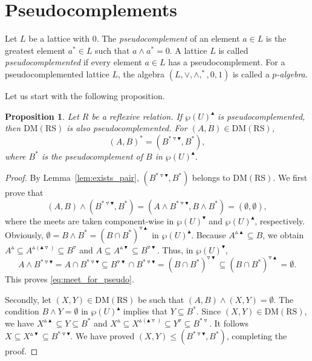 \documentclass[11pt,a4paper]{amsart}
\newcommand{\UP}{\blacktriangle}
\newcommand{\DOWN}{\blacktriangledown}
\newcommand{\Up}{\vartriangle}
\newcommand{\Down}{\triangledown}
\theoremstyle{plain}
\newtheorem{proposition}[theorem]{Proposition}
\theoremstyle{definition}
\theoremstyle{remark}
\numberwithin{equation}{section}
\begin{document}
\section{Pseudocomplements} \label{sec:pseudocomplements}

Let $L$ be a lattice with $0$. The \emph{pseudocomplement} of an element $a \in L$ is the greatest 
element $a^* \in L$ such that $a \wedge a^* = 0$. A lattice $L$ is called \emph{pseudocomplemented} 
if every element $a \in L$ has a pseudocomplement. For a pseudocomplemented lattice $L$,
the algebra $(L,\vee,\wedge,^*,0,1)$ is called a \emph{$p$-algebra}.

Let us start with the following proposition.

\begin{proposition} \label{prop:pseudomplement}
Let $R$ be a reflexive relation.
If $\wp(U)^\UP$ is pseudocomplemented, then $\mathrm{DM(RS)}$
is also pseudocomplemented. For $(A,B) \in \mathrm{DM(RS)}$, 
\[ (A,B)^* = (B^{* \Down \DOWN}, B^*),\]
where $B^*$ is the pseudocomplement of $B$ in $\wp(U)^\UP$.
\end{proposition}

\begin{proof} By Lemma~\ref{lem:exists_pair}, $(B^{* \Down \DOWN}, B^*)$
belongs to $\mathrm{DM(RS)}$. 
We first prove that 
\begin{equation} \label{eq:meet_for_pseudo}
 (A,B) \wedge (B^{* \Down \DOWN}, B^*) = 
  (A \wedge B^{* \Down \DOWN}, B \wedge B^*)
  = (\emptyset,\emptyset),
\end{equation}
where the meets are taken component-wise in 
$\wp(U)^\DOWN$ and $\wp(U)^\UP$, respectively.
Obviously, $\emptyset = B \wedge B^* = 
(B \cap B^*)^{\Down \UP}$ in $\wp(U)^\UP$.
Because $A^{\Up \UP} \subseteq B$, we obtain
$A^\Up \subseteq A^{\Up (\UP \Down)} \subseteq B^\Down$ and 
$A \subseteq A^{\Up\DOWN} \subseteq B^{\Down \DOWN}$.
Thus, in $\wp(U)^\DOWN$,
\[ A \wedge B^{* \Down \DOWN} =
A \cap B^{* \Down \DOWN} \subseteq
B^{\Down \DOWN} \cap B^{* \Down \DOWN} =
(B \cap B^*)^{\Down \DOWN}
\subseteq (B \cap B^*)^{\Down \UP}
= \emptyset.
\]
This proves \eqref{eq:meet_for_pseudo}.

Secondly,  let $(X,Y) \in \mathrm{DM(RS)}$ be such that 
$(A,B) \wedge (X,Y) = \emptyset$. The condition
$B \wedge Y = \emptyset$ in $\wp(U)^\UP$ implies
that $Y \subseteq B^*$. Since $(X,Y) \in \mathrm{DM(RS)}$, we have
$X^{\Up \UP} \subseteq Y \subseteq B^*$ and
$X^\Up \subseteq X^{\Up (\UP \Down)} \subseteq Y^\Down \subseteq 
B^{* \Down}$. It follows
$X \subseteq X^{\Up\DOWN} \subseteq B^{*\Down \DOWN}$.
We have proved $(X,Y) \leq (B^{* \Down \DOWN}, B^*)$,
completing the proof.
\end{proof}
\end{document}
